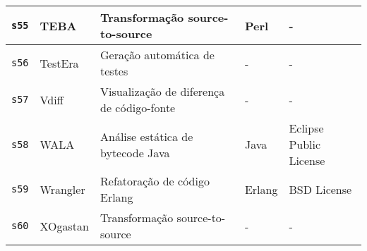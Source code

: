 \begin{longtable}{| l | p{4.5cm} | p{7cm} | p{1.5cm} | p{3cm} |}
    \hline
    \texttt{s55} &
      TEBA &
      Transformação source-to-source &
      Perl &
      - \\
    \hline
    \texttt{s56} &
      TestEra &
      Geração automática de testes &
      - &
      - \\
    \hline
    \texttt{s57} &
      Vdiff &
      Visualização de diferença de código-fonte &
      - &
      - \\
    \hline
    \texttt{s58} &
      WALA &
      Análise estática de bytecode Java &
      Java &
      Eclipse Public License \\
    \hline
    \texttt{s59} &
      Wrangler &
      Refatoração de código Erlang &
      Erlang &
      BSD License \\
    \hline
    \texttt{s60} &
      XOgastan &
      Transformação source-to-source &
      - &
      - \\
    \hline
  \hline
\end{longtable}
